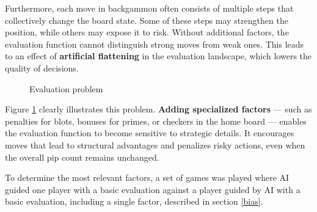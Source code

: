 Furthermore, each move in backgammon often consists of multiple steps that collectively change the board state. Some of these steps may strengthen the position, while others may expose it to risk. Without additional factors, the evaluation function cannot distinguish strong moves from weak ones. This leads to an effect of \textbf{artificial flattening} in the evaluation landscape, which lowers the quality of decisions.

\begin{figure}[H]
    \centering
    \caption{Evaluation problem}
    \label{EvalProblem}
\end{figure}

Figure \ref{EvalProblem} clearly illustrates this problem. \textbf{Adding specialized factors} — such as penalties for blots, bonuses for primes, or checkers in the home board — enables the evaluation function to become sensitive to strategic details. It encourages moves that lead to structural advantages and penalizes risky actions, even when the overall pip count remains unchanged.

To determine the most relevant factors, a set of games was played where AI guided one player with a basic evaluation against a player guided by AI with a basic evaluation, including a single factor, described in section \ref{bias}.

